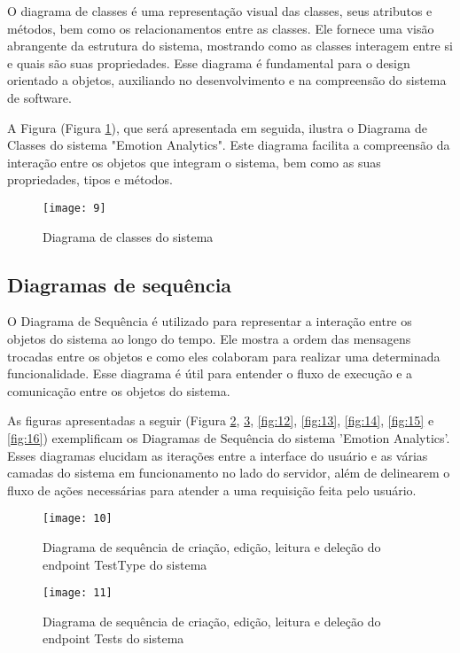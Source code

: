 O diagrama de classes \cite{27} é uma representação visual das classes, seus atributos e métodos, bem como os relacionamentos entre as classes. Ele fornece uma visão abrangente da estrutura do sistema, mostrando como as classes interagem entre si e quais são suas propriedades. Esse diagrama é fundamental para o design orientado a objetos, auxiliando no desenvolvimento e na compreensão do sistema de software.

A Figura (Figura \ref{fig:9}), que será apresentada em seguida, ilustra o Diagrama de Classes do sistema "Emotion Analytics". Este diagrama facilita a compreensão da interação entre os objetos que integram o sistema, bem como as suas propriedades, tipos e métodos.

\begin{figure}[h]
  \caption{Diagrama de classes do sistema}
  \centering
  \texttt{[image: 9]}
  \label{fig:9}
\end{figure}
\FloatBarrier

\clearpage
\subsection{Diagramas de sequência}

O Diagrama de Sequência \cite{28} é utilizado para representar a interação entre os objetos do sistema ao longo do tempo. Ele mostra a ordem das mensagens trocadas entre os objetos e como eles colaboram para realizar uma determinada funcionalidade. Esse diagrama é útil para entender o fluxo de execução e a comunicação entre os objetos do sistema.

As figuras apresentadas a seguir (Figura \ref{fig:10}, \ref{fig:11}, \ref{fig:12}, \ref{fig:13}, \ref{fig:14}, \ref{fig:15} e \ref{fig:16}) exemplificam os Diagramas de Sequência do sistema 'Emotion Analytics'. Esses diagramas elucidam as iterações entre a interface do usuário e as várias camadas do sistema em funcionamento no lado do servidor, além de delinearem o fluxo de ações necessárias para atender a uma requisição feita pelo usuário.

\begin{figure}[h]
  \caption{Diagrama de sequência de criação, edição, leitura e deleção do endpoint TestType do sistema}
  \centering
  \texttt{[image: 10]}
  \label{fig:10}
\end{figure}
\FloatBarrier

\begin{figure}[h]
  \caption{Diagrama de sequência de criação, edição, leitura e deleção do endpoint Tests do sistema}
  \centering
  \texttt{[image: 11]}
  \label{fig:11}
\end{figure}
\FloatBarrier

